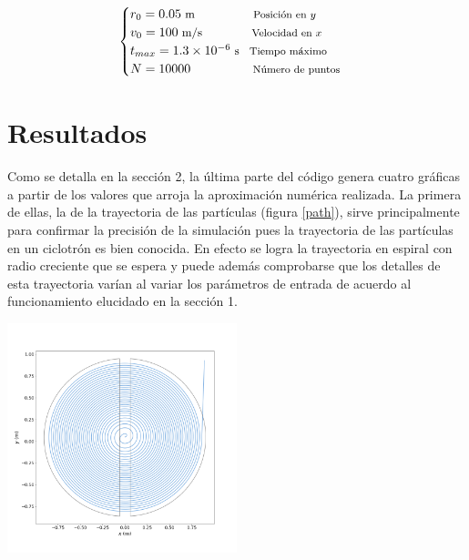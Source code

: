 \documentclass[letterpaper, 11pt]{article}
\begin{document}
\begin{multicols}{2}
\begin{equation}
\label{simP}
    \begin{cases}
        r_0 = 0.05 \hspace{3pt} \text{\small{m}} \hspace{46pt} \text{\footnotesize{Posición en $y$}}\\
        v_0 = 100 \hspace{3pt} \text{\small{m/s}} \hspace{39pt} \text{\footnotesize{Velocidad en $x$}}\\
        t_{max} = \num{1.3e-6} \hspace{3pt} \text{\small{s}} \hspace{8pt} \text{\footnotesize{Tiempo máximo}}\\
        N = 10000 \hspace{49pt} \text{\footnotesize{Número de puntos}}
    \end{cases}
\end{equation}

\section{Resultados}
Como se detalla en la sección 2, la última parte del código genera cuatro gráficas a partir de los valores que arroja la aproximación numérica realizada. La primera de ellas, la de la trayectoria de las partículas (figura \ref{path}), sirve principalmente para confirmar la precisión de la simulación pues la trayectoria de las partículas en un ciclotrón es bien conocida. En efecto se logra la trayectoria en espiral con radio creciente que se espera y puede además comprobarse que los detalles de esta trayectoria varían al variar los parámetros de entrada de acuerdo al funcionamiento elucidado en la sección 1.

\begin{center}
    \includegraphics[width=0.5\textwidth]{path.png}
    \label{path}
\end{center}


\end{multicols}
\end{document}

